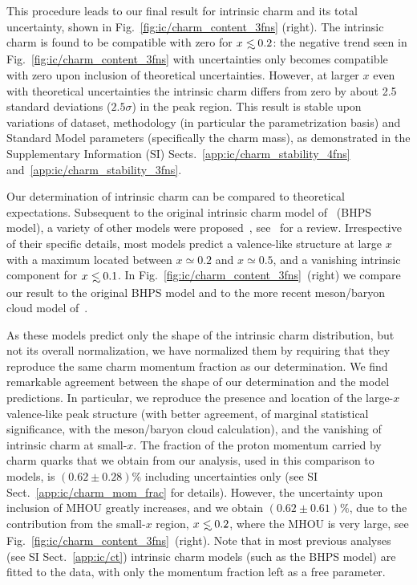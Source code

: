 This procedure leads to our final result for intrinsic charm and its total
uncertainty, shown in Fig.~\ref{fig:ic/charm_content_3fns} (right).
%
The intrinsic charm \pdf is found to be compatible with zero for
$x\lsim 0.2$: the negative trend 
seen  in Fig.~\ref{fig:ic/charm_content_3fns} with \pdf uncertainties only 
becomes 
compatible with zero upon inclusion of  theoretical
uncertainties. However, at
larger $x$ even with theoretical uncertainties
the intrinsic charm \pdf
 differs 
from zero by about 2.5 standard deviations ($2.5\sigma$) in the peak region.
%
This result  is stable upon variations of dataset, methodology (in
particular the \pdf  parametrization basis) and Standard Model
parameters (specifically the charm mass),
as demonstrated in the Supplementary Information (SI) Sects.~\ref{app:ic/charm_stability_4fns}
and~\ref{app:ic/charm_stability_3fns}. 

Our determination of intrinsic charm can be compared to theoretical expectations.
%
Subsequent to the
original intrinsic charm model of~\cite{Brodsky:1980pb} (BHPS
model),
a variety of other models were  
proposed~\cite{Hoffmann:1983ah,Pumplin:2005yf,Paiva:1996dd,Steffens:1999hx,Hobbs:2013bia},
see~\cite{Brodsky:2015fna} for a review.
%
Irrespective of their specific details, most models predict a valence-like
structure at large $x$ 
with a maximum located  between $x\simeq 0.2$ and $x\simeq 0.5$, and a
vanishing intrinsic component for
$x\lsim 0.1$.
%
In Fig.~\ref{fig:ic/charm_content_3fns}~(right) we compare our result to
the original BHPS model and to the more recent meson/baryon cloud model of~\cite{Hobbs:2013bia}.

As these models predict only the shape of the
intrinsic charm distribution, but not 
its overall normalization, we have normalized them by requiring
that they reproduce the same 
charm momentum fraction as our determination.
%
We find remarkable agreement between the shape of our 
determination and the model predictions.
%
In particular, we reproduce  the presence and location of the large-$x$ valence-like peak
structure (with  better agreement, of marginal statistical significance, with
the meson/baryon cloud calculation),  and the vanishing of 
intrinsic charm at small-$x$.
%
The fraction of the proton momentum carried by charm quarks that we
obtain from our analysis, 
used in this comparison to models,  is $\left( 0.62 \pm 0.28\right) \%$
including \pdf uncertainties only (see
SI Sect.~\ref{app:ic/charm_mom_frac} for details).
%
However, the uncertainty
upon inclusion of MHOU greatly increases, and we obtain
$\left( 0.62 \pm 0.61\right) \%$, due to the contribution from the small-$x$
region, $x\lsim 0.2$, where the MHOU is very large, see
Fig.~\ref{fig:ic/charm_content_3fns}~(right).
%
%
Note that in most previous
analyses~\cite{Hou:2017khm} (see SI Sect.~\ref{app:ic/ct}) intrinsic charm models (such as the BHPS
model) are fitted to the data, with only the momentum fraction left as
a free parameter.

